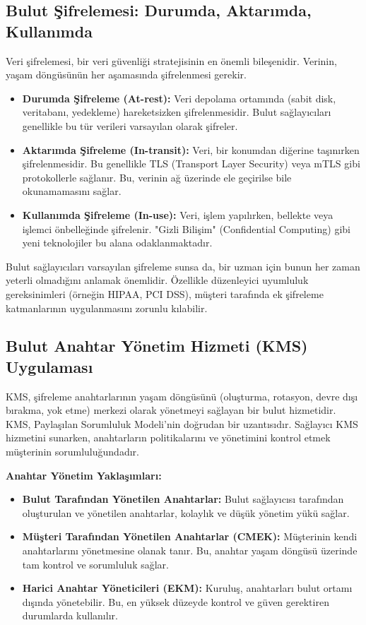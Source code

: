 \subsection{Bulut Şifrelemesi: Durumda, Aktarımda, Kullanımda}
Veri şifrelemesi, bir veri güvenliği stratejisinin en önemli bileşenidir. Verinin, yaşam döngüsünün her aşamasında şifrelenmesi gerekir.
\begin{itemize}
    \item \textbf{Durumda Şifreleme (At-rest):} Veri depolama ortamında (sabit disk, veritabanı, yedekleme) hareketsizken şifrelenmesidir. Bulut sağlayıcıları genellikle bu tür verileri varsayılan olarak şifreler.
    \item \textbf{Aktarımda Şifreleme (In-transit):} Veri, bir konumdan diğerine taşınırken şifrelenmesidir. Bu genellikle TLS (Transport Layer Security) veya mTLS gibi protokollerle sağlanır. Bu, verinin ağ üzerinde ele geçirilse bile okunamamasını sağlar.
    \item \textbf{Kullanımda Şifreleme (In-use):} Veri, işlem yapılırken, bellekte veya işlemci önbelleğinde şifrelenir. "Gizli Bilişim" (Confidential Computing) gibi yeni teknolojiler bu alana odaklanmaktadır.
\end{itemize}
Bulut sağlayıcıları varsayılan şifreleme sunsa da, bir uzman için bunun her zaman yeterli olmadığını anlamak önemlidir. Özellikle düzenleyici uyumluluk gereksinimleri (örneğin HIPAA, PCI DSS), müşteri tarafında ek şifreleme katmanlarının uygulanmasını zorunlu kılabilir.

\subsection{Bulut Anahtar Yönetim Hizmeti (KMS) Uygulaması}
KMS, şifreleme anahtarlarının yaşam döngüsünü (oluşturma, rotasyon, devre dışı bırakma, yok etme) merkezi olarak yönetmeyi sağlayan bir bulut hizmetidir. KMS, Paylaşılan Sorumluluk Modeli'nin doğrudan bir uzantısıdır. Sağlayıcı KMS hizmetini sunarken, anahtarların politikalarını ve yönetimini kontrol etmek müşterinin sorumluluğundadır.

\textbf{Anahtar Yönetim Yaklaşımları:}
\begin{itemize}
    \item \textbf{Bulut Tarafından Yönetilen Anahtarlar:} Bulut sağlayıcısı tarafından oluşturulan ve yönetilen anahtarlar, kolaylık ve düşük yönetim yükü sağlar.
    \item \textbf{Müşteri Tarafından Yönetilen Anahtarlar (CMEK):} Müşterinin kendi anahtarlarını yönetmesine olanak tanır. Bu, anahtar yaşam döngüsü üzerinde tam kontrol ve sorumluluk sağlar.
    \item \textbf{Harici Anahtar Yöneticileri (EKM):} Kuruluş, anahtarları bulut ortamı dışında yönetebilir. Bu, en yüksek düzeyde kontrol ve güven gerektiren durumlarda kullanılır.
\end{itemize}

